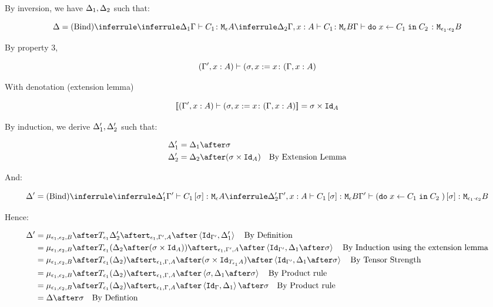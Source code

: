 {    By inversion, we have $\Delta_1, \Delta_2$ such that:
    
    \begin{equation}
        \D = \ntreeruleII{Bind}{
            \treeruleI{\D_1}{\typerelation{\G}{C_1}{\mea}}
            }{
            \treeruleI{\D_2}{\typerelation{\G, x:A }{C_1}{\meb}}
        }{
            \typerelation{\G}{\doin{x}{C_1}{C_2}}{\M{\e_1\dot\e_2}{B}}
        }
    \end{equation}

    By property 3,

    \begin{equation}
        (\Gamma', x:A) \vdash (\sigma, x:= x \colon (\Gamma, x: A)
    \end{equation}

    With denotation (extension lemma)

    \begin{equation}
        {\bf [\![}(\Gamma', x:A) \vdash (\sigma, x:= x \colon (\Gamma, x: A){\bf ]\!]} = \sigma\times\texttt{Id}_{A}
    \end{equation}

    By induction, we derive $\Delta_1', \Delta_2'$ such that:

    \begin{align}
        \D_1' & = \D_1\after \si\\
        \D_2' & = \D_2\after (\si\times\Id{A})\qt{By Extension Lemma}
    \end{align}

    And:

    \begin{equation}
        \D' = \ntreeruleII{Bind}{
            \treeruleI{\D_1'}{\typerelation{\G'}{C_1\ssi}{\mea}}
            }{
            \treeruleI{\D_2'}{\typerelation{\G', x:A }{C_1\ssi}{\meb}}
        }{
            \typerelation{\G'}{(\doin{x}{C_1}{C_2})\ssi}{\M{\e_1\dot\e_2}{B}}
        }
    \end{equation}

    Hence:

    \begin{align}
        \D' & = \bind{\e_1}{\e_2}{B}\after\T{\e_1}{\D_2'}\after\tstrength{\e_1}{\G'}{A}\after\pr{\Id{\G'}}{\D_1'}\qt{By Definition}\\
        & = \bind{\e_1}{\e_2}{B}\after\T{\e_1}{(\D_2\after(\si\times\Id{A}))}\after\tstrength{\e_1}{\G'}{A}\after\pr{\Id{\G'}}{\D_1\after\si}\qt{By Induction using the extension lemma}\\
        & = \bind{\e_1}{\e_2}{B}\after\T{\e_1}{(\D_2)}\after\tstrength{\e_1}{\G}{A}\after(\si\times\Id{\T{\e_1}{A}})\after\pr{\Id{\G'}}{\D_1\after\si}\qt{By Tensor Strength}\\
        & = \bind{\e_1}{\e_2}{B}\after\T{\e_1}{(\D_2)}\after\tstrength{\e_1}{\G}{A}\after\pr{\si}{\D_1\after\si}\qt{By Product rule}\\
        & = \bind{\e_1}{\e_2}{B}\after\T{\e_1}{(\D_2)}\after\tstrength{\e_1}{\G}{A}\after\pr{\idg}{\D_1}\after\si\qt{By Product rule}\\
        &= \D\after\si\qt{By Defintion}\\
    \end{align}


}
